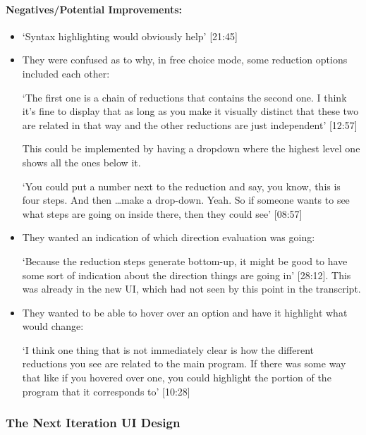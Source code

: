 \paragraph{Negatives/Potential Improvements:}
\begin{itemize}
    \item `Syntax highlighting would obviously help' [21:45]
    \item They were confused as to why, in free choice mode, some reduction options included each other: 
    
    `The first one is a chain of reductions that contains the second one. I think it's fine to display that as long as you make it visually distinct that these two are related in that way and the other reductions are just independent' [12:57]

    This could be implemented by having a dropdown where the highest level one shows all the ones below it. 

    `You could put a number next to the reduction and say, you know, this is four steps. And then \ldots make a drop-down. Yeah. So if someone wants to see what steps are going on inside there, then they could see' [08:57]
    \item They wanted an indication of which direction evaluation was going: 
    
    `Because the reduction steps generate bottom-up, it might be good to have some sort of indication about the direction things are going in' [28:12]. This was already in the new UI, which had not seen by this point in the transcript.

    \item They wanted to be able to hover over an option and have it highlight what would change: 
    
    `I think one thing that is not immediately clear is how the different reductions you see are related to the main program. If there was some way that like if you hovered over one, you could highlight the portion of the program that it corresponds to' [10:28]
\end{itemize}

\subsubsection{The Next Iteration UI Design}
